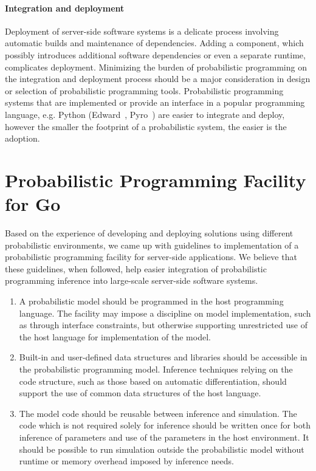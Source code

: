 \documentclass[sigplan,review]{acmart}\settopmatter{printfolios=true,printccs=false,printacmref=false}
\begin{document}
\paragraph{Integration and deployment} Deployment of server-side
software systems is a delicate process involving automatic
builds and maintenance of dependencies. Adding  a component,
which possibly introduces additional software dependencies or
even a separate runtime, complicates deployment. Minimizing the
burden of probabilistic programming on the integration
and deployment process should be a major consideration in
design or selection of probabilistic programming tools.
Probabilistic programming systems that are implemented or 
provide an interface in a popular programming language, e.g.
Python (Edward~\cite{THS+17}, Pyro~\cite{Pyro18}) are easier
to integrate and deploy, however the smaller the footprint
of a probabilistic system, the easier is the adoption.

\section{Probabilistic Programming Facility for Go}

Based on the experience of developing and deploying solutions
using different probabilistic environments, we came up with
guidelines to implementation of a probabilistic programming
facility for server-side applications. We believe that these
guidelines, when followed, help easier integration of
probabilistic programming inference into large-scale server-side
software systems.

\begin{enumerate}
\item A probabilistic model should be programmed in the host
programming language. The facility may impose a discipline on
model implementation, such as through interface constraints, but
otherwise supporting unrestricted use of the host language for
implementation of the model.

\item Built-in and user-defined data structures and libraries
should be accessible in the probabilistic programming model.
Inference techniques relying on the code structure, such as
those based on automatic differentiation, should support the
use of common data structures of the host language.

\item The model code should be reusable between inference and
simulation. The code which is not required solely for inference
should be written once for both inference of parameters and use
of the parameters in the host environment.  It should be
possible to run simulation outside the probabilistic model without
runtime or memory overhead imposed by inference needs.
\end{enumerate}
\end{document}

